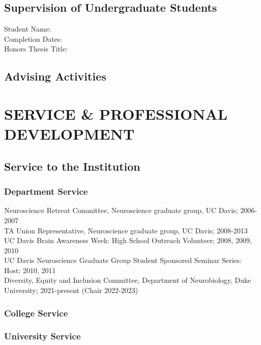 \documentclass[a4paper,9pt]{extarticle}
\newenvironment{subs} %
  {\adjustwidth{2em}{0pt}}
  {\endadjustwidth}
\begin{document}
    \subsection*{Supervision of Undergraduate Students}
        Student Name:\\
        Completion Dates:\\
        Honors Thesis Title: 
    \subsection*{Advising Activities}
        \lipsum[1][5-11]

\section*{SERVICE \& PROFESSIONAL DEVELOPMENT}
    \subsection*{Service to the Institution}
    \begin{subs}
        \subsubsection*{Department Service} 
            Neuroscience Retreat Committee, Neuroscience graduate group, UC Davis; 2006-2007 \\
TA Union Representative, Neuroscience graduate group, UC Davis; 2008-2013 \\
UC Davis Brain Awareness Week: High School Outreach Volunteer; 2008, 2009, 2010 \\
UC Davis Neuroscience Graduate Group Student Sponsored Seminar Series: Host; 2010, 2011 \\
Diversity, Equity and Inclusion Committee, Department of Neurobiology, Duke University; 2021-present (Chair 2022-2023) \\

        \subsubsection*{College Service}
            \lipsum[1][5-8]
        \subsubsection*{University Service}
            \lipsum[1][5-8]
    \end{subs}
\end{document}

